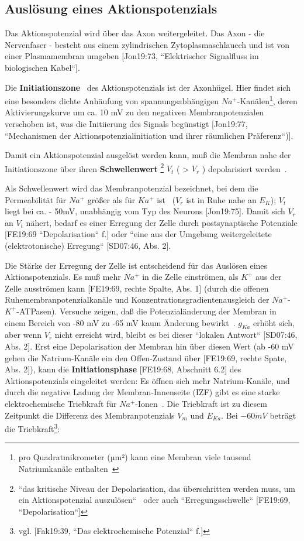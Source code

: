 {{\subsection{Auslösung eines Aktionspotenzials}

Das Aktionspotenzial wird über das Axon weitergeleitet. Das Axon - die Nervenfaser - besteht aus einem zylindrischen Zytoplasmaschlaucch und ist von einer Plasmamembran umgeben [Jon19:73, ``Elektrischer Signalfluss im biologischen Kabel``].

Die \textbf{Initiationszone}~\cite[111]{BCP18} des Aktionspotenzials ist der Axonhügel. Hier findet sich eine besonders dichte Anhäufung von spannungsabhängigen $Na^+$-Kanälen\footnote{
 pro Quadratmikrometer (µm²) kann eine Membran viele tausend Natriumkanäle enthalten~\cite[99]{BCP18}
}, deren Aktivierungskurve um ca. 10 mV zu den negativen Membranpotenzialen verschoben ist, was die Initiierung des Signals begünstigt [Jon19:77, ``Mechanismen der Aktionspotenzialinitiation und ihrer räumlichen Präferenz``)].

Damit ein Aktionspotenzial ausgelöst werden kann, muß die Membran nahe der Initiationszone über ihren \textbf{Schwellenwert} \footnote{
 ``das kritische Niveau der Depolarisation, das überschritten werden muss, um ein Aktionspotenzial auszulösen``~\cite[88]{BCP18} oder auch ``Erregungsschwelle`` {[FE19:69, ``Depolarisation``]}
} $V_t$ ( > $V_r$ ) depolarisiert werden~\cite[111]{BCP18}.


 Als Schwellenwert wird das Membranpotenzial bezeichnet, bei dem die Permeabilität für $Na^+$ größer als für $Ka^+$ ist~\cite[103]{BCP18} ($V_r$ ist in Ruhe nahe an $E_K$); $V_t$ liegt bei ca. - 50mV, unabhängig vom Typ des Neurons [Jon19:75].
 Damit sich $V_r$ an $V_t$ nähert, bedarf es einer Erregung der Zelle durch postsynaptische Potenziale [FE19:69 ``Depolarisation`` f.] oder ``eine aus der Umgebung weitergeleitete (elektrotonische) Erregung`` [SD07:46, Abs. 2].

Die Stärke der Erregung der Zelle ist entscheidend für das Auslösen eines Aktionspotenzials. Es muß mehr $Na^+$ in die Zelle einströmen, als $K^+$ aus der Zelle ausströmen kann [FE19:69, rechte Spalte, Abs. 1] (durch die offenen Ruhemembranpotenzialkanäle und Konzentrationsgradientenausgleich der $Na^+$-$K^+$-ATPasen).
Versuche zeigen, daß die Potenzialänderung der Membran in einem Bereich von -80 mV zu -65 mV kaum Änderung bewirkt~\cite[99]{BCP18}. $g_{Ka}$ erhöht sich, aber wenn $V_r$ nicht erreicht wird, bleibt es bei dieser ``lokalen Antwort`` [SD07:46, Abs. 2]. Erst eine Depolarisation der Membran hin über diesen Wert (ab -60 mV gehen die Natrium-Kanäle ein den Offen-Zustand über [FE19:69, rechte Spate, Abs. 2]), kann die \textbf{Initiationsphase} [FE19:68, Abschnitt 6.2] des Aktionspotenzials eingeleitet werden: Es öffnen sich mehr Natrium-Kanäle, und durch die negative Ladung der Membran-Innenseite (IZF) gibt es eine starke elektrochemische Triebkraft für $Na^+$-Ionen~\cite[103]{BCP18}. Die Triebkraft ist zu diesem Zeitpunkt die Differenz des Membranpotenzials $V_m$ und $E_{Ka}$. Bei $-60 mV$ beträgt die Triebkraft\footnote{
 vgl. {[Fak19:39, ``Das elektrochemische Potenzial`` f.]}
}:

}}

